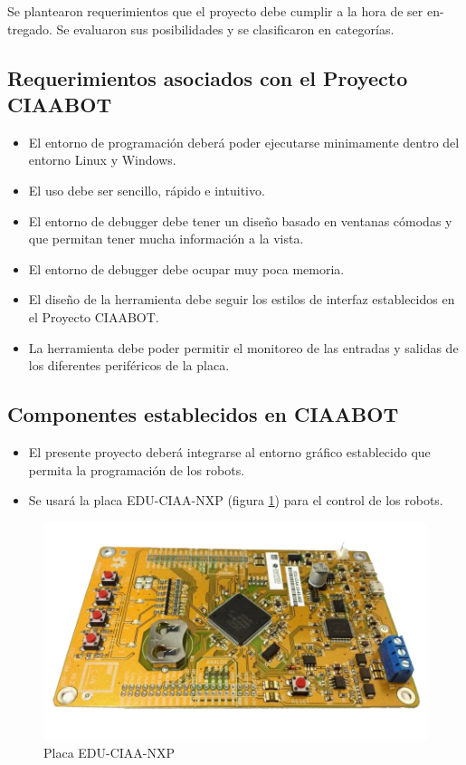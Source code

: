 Se plantearon requerimientos que el proyecto debe cumplir a la hora de ser en-
tregado. Se evaluaron sus posibilidades y se clasificaron en categorías.

\subsection{Requerimientos asociados con el Proyecto CIAABOT}

\begin{itemize}
	\item El entorno de programación deberá poder ejecutarse minimamente dentro del entorno Linux y Windows.	
	\item El uso debe ser sencillo, rápido e intuitivo.
	\item El entorno de debugger debe tener un diseño basado en ventanas cómodas y que permitan
	tener mucha información a la vista.
	\item El entorno de debugger debe ocupar muy poca memoria.
	\item El diseño de la herramienta debe seguir los estilos de interfaz establecidos en el Proyecto CIAABOT.
	\item La herramienta debe poder permitir el monitoreo de las entradas y salidas de los diferentes periféricos de la placa.	
\end{itemize}

\subsection{Componentes establecidos en CIAABOT}

\begin{itemize}
	\item El presente proyecto deberá integrarse al entorno gráfico establecido que permita la programación de los robots.	
	\item Se usará la placa EDU-CIAA-NXP (figura \ref{fig:edu-ciaa-nxp}) para el control de los robots.	
\end{itemize}

\begin{figure}[h]
	\centering
	\includegraphics[scale=.30]{./Figures/edu-ciaa-nxp.png}
	\caption{Placa EDU-CIAA-NXP}
	\label{fig:edu-ciaa-nxp}
\end{figure}

